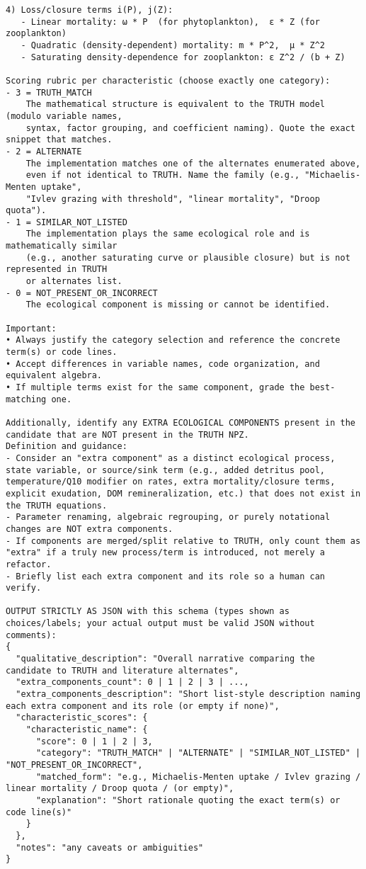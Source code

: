 \begin{lstlisting}[basicstyle=\tiny\ttfamily, breaklines=true]
4) Loss/closure terms i(P), j(Z):
   - Linear mortality: ω * P  (for phytoplankton),  ε * Z (for zooplankton)
   - Quadratic (density-dependent) mortality: m * P^2,  μ * Z^2
   - Saturating density-dependence for zooplankton: ε Z^2 / (b + Z)

Scoring rubric per characteristic (choose exactly one category):
- 3 = TRUTH_MATCH
    The mathematical structure is equivalent to the TRUTH model (modulo variable names,
    syntax, factor grouping, and coefficient naming). Quote the exact snippet that matches.
- 2 = ALTERNATE
    The implementation matches one of the alternates enumerated above,
    even if not identical to TRUTH. Name the family (e.g., "Michaelis-Menten uptake",
    "Ivlev grazing with threshold", "linear mortality", "Droop quota").
- 1 = SIMILAR_NOT_LISTED
    The implementation plays the same ecological role and is mathematically similar
    (e.g., another saturating curve or plausible closure) but is not represented in TRUTH
    or alternates list.
- 0 = NOT_PRESENT_OR_INCORRECT
    The ecological component is missing or cannot be identified.

Important:
• Always justify the category selection and reference the concrete term(s) or code lines.
• Accept differences in variable names, code organization, and equivalent algebra.
• If multiple terms exist for the same component, grade the best-matching one.

Additionally, identify any EXTRA ECOLOGICAL COMPONENTS present in the candidate that are NOT present in the TRUTH NPZ.
Definition and guidance:
- Consider an "extra component" as a distinct ecological process, state variable, or source/sink term (e.g., added detritus pool, temperature/Q10 modifier on rates, extra mortality/closure terms, explicit exudation, DOM remineralization, etc.) that does not exist in the TRUTH equations.
- Parameter renaming, algebraic regrouping, or purely notational changes are NOT extra components.
- If components are merged/split relative to TRUTH, only count them as "extra" if a truly new process/term is introduced, not merely a refactor.
- Briefly list each extra component and its role so a human can verify.

OUTPUT STRICTLY AS JSON with this schema (types shown as choices/labels; your actual output must be valid JSON without comments):
{
  "qualitative_description": "Overall narrative comparing the candidate to TRUTH and literature alternates",
  "extra_components_count": 0 | 1 | 2 | 3 | ...,
  "extra_components_description": "Short list-style description naming each extra component and its role (or empty if none)",
  "characteristic_scores": {
    "characteristic_name": {
      "score": 0 | 1 | 2 | 3,
      "category": "TRUTH_MATCH" | "ALTERNATE" | "SIMILAR_NOT_LISTED" | "NOT_PRESENT_OR_INCORRECT",
      "matched_form": "e.g., Michaelis-Menten uptake / Ivlev grazing / linear mortality / Droop quota / (or empty)",
      "explanation": "Short rationale quoting the exact term(s) or code line(s)"
    }
  },
  "notes": "any caveats or ambiguities"
}
\end{lstlisting}

